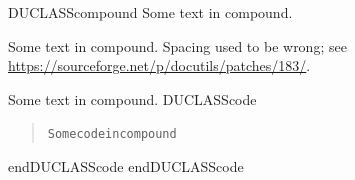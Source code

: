 \documentclass[a4paper]{article}
\newenvironment{DUclass}[1]%
    {%
     \def\DocutilsClassFunctionName{DUCLASS#1}
     \csname \DocutilsClassFunctionName \endcsname}%
    {\csname end\DocutilsClassFunctionName \endcsname}%
\begin{document}
\begin{DUclass}{compound}
Some text in compound.

Some text in compound.  Spacing used to be wrong; see \url{https://sourceforge.net/p/docutils/patches/183/}.
\begin{alectryon}
  \begin{\al{txt}}
  \end{\al{txt}}
\end{alectryon}
\begin{alectryon}
  \begin{\al{txt}}
  \end{\al{txt}}
\end{alectryon}
Some text in compound.
\begin{DUclass}{code}
\begin{quote}
\begin{alltt}
Some code in compound
\end{alltt}
\end{quote}
\end{DUclass}
\end{DUclass}
\end{document}
